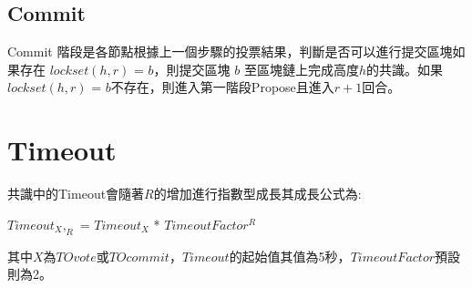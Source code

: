 \subsection{Commit}\label{se_3}
Commit 階段是各節點根據上一個步驟的投票結果，判斷是否可以進行提交區塊如果存在 $lockset(h,r)$ = $b$，則提交區塊 $b$ 至區塊鏈上完成高度$h$的共識。如果 $lockset(h,r)$ = $b$不存在，則進入第一階段Propose且進入$r+1$回合。

\section{Timeout}\label{se_3}

共識中的Timeout會隨著$R$的增加進行指數型成長其成長公式為: 

$Timeout_X,_R$ = $Timeout_X$ * $TimeoutFactor^R$

其中$X$為$TOvote$或$TOcommit$，$Timeout$的起始值其值為5秒，$TimeoutFactor$預設則為2。 


